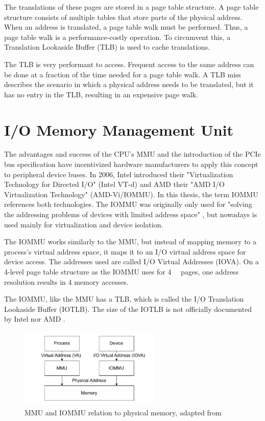 The translations of these pages are stored in a page table structure. A page table structure consists of multiple tables that store parts of the physical address. When an address is translated, a page table walk must be performed.  Thus, a page table walk is a performance-costly operation. To circumvent this, a Translation Lookaside Buffer (TLB) is used to cache translations.

The TLB is very performant to access. Frequent access to the same address can be done at a fraction of the time needed for a page table walk. A TLB miss describes the scenario in which a physical address needs to be translated, but it has no entry in the TLB, resulting in an expensive page walk.

\section{I/O Memory Management Unit}
The advantages and success of the CPU's MMU and the introduction of the PCIe bus specification have incentivized hardware manufacturers to apply this concept to peripheral device buses. In 2006, Intel introduced their "Virtualization Technology for Directed I/O" (Intel VT-d) and AMD their "AMD I/O Virtualization Technology" (AMD-Vi/IOMMU). In this thesis, the term IOMMU references both technologies. The IOMMU was originally only used for "solving the addressing problems of devices with limited address space" \cite{vfiokerneldocs}, but nowadays is used mainly for virtualization and device isolation.

The IOMMU works similarly to the MMU, but instead of mapping memory to a process's virtual address space, it maps it to an I/O virtual address space for device access. The addresses used are called I/O Virtual Addresses (IOVA).
On a 4-level page table structure as the IOMMU uses for \qty{4}{\kibi\byte} pages, one address resolution results in 4 memory accesses.

The IOMMU, like the MMU has a TLB, which is called the I/O Translation Lookaside Buffer (IOTLB). The size of the IOTLB is not officially documented by Intel nor AMD \cite{iommuhuber}.

\begin{figure}[H]
    \centering
    \includegraphics[width=0.6\textwidth]{figures/MMUIOMMU.pdf}
    \caption{MMU and IOMMU relation to physical memory, adapted from \cite{iommuscalability}}
    \label{fig:mmuvsiommu}
\end{figure}

